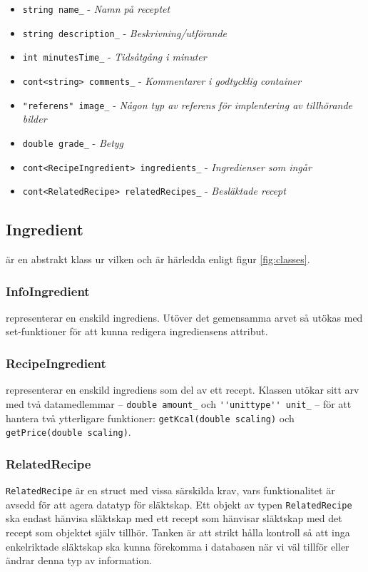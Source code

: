   \begin{itemize}
    \item \verb+string name_+ - \emph{Namn på receptet}
    \item \verb+string description_+ - \emph{Beskrivning/utförande}
    \item \verb+int minutesTime_+ - \emph{Tidsåtgång i minuter}
    \item \verb+cont<string> comments_+ - \emph{Kommentarer i godtycklig container}
    \item \verb+"referens" image_+ - \emph{Någon typ av referens för implentering av tillhörande bilder}
    \item \verb+double grade_+ - \emph{Betyg}
  \end{itemize}

  \begin{itemize}
    \item \verb+cont<RecipeIngredient> ingredients_+ - \emph{Ingredienser som ingår}
    \item \verb+cont<RelatedRecipe> relatedRecipes_+ - \emph{Besläktade recept}
  \end{itemize}


\subsection{Ingredient}
\Ingredient{} är en abstrakt klass ur vilken \InfoIngredient{} och \RecipeIngredient{} är härledda enligt figur \ref{fig:classes}.

\subsubsection{InfoIngredient}
\InfoIngredient representerar en enskild ingrediens. Utöver det gemensamma arvet så utökas \InfoIngredient med set-funktioner för att kunna redigera ingrediensens attribut.

\subsubsection{RecipeIngredient}
\RecipeIngredient{} representerar en enskild ingrediens som del av ett recept. Klassen utökar sitt arv med två datamedlemmar -- \verb=double amount_= och \verb=''unittype'' unit_= -- för att hantera två ytterligare funktioner: \verb+getKcal(double scaling)+ och \verb+getPrice(double scaling)+.
 
\subsubsection{RelatedRecipe}
\verb+RelatedRecipe+ är en struct med vissa särskilda krav, vars funktionalitet är avsedd för att agera datatyp för släktskap. Ett objekt av typen \verb+RelatedRecipe+ ska endast hänvisa släktskap med ett recept som hänvisar släktskap med det recept som objektet själv tillhör. Tanken är att strikt hålla kontroll så att inga enkelriktade släktskap ska kunna förekomma i databasen när vi väl tillför eller ändrar denna typ av information.


